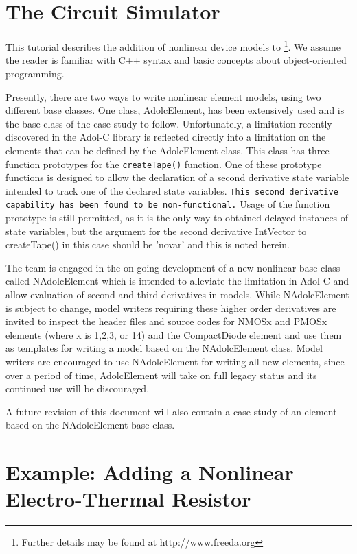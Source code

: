 \section{The \FDA Circuit Simulator}

This tutorial describes the addition of nonlinear device models to
\FDA \footnote{Further details may be found at
http://www.freeda.org}. We assume the reader is familiar with C++
syntax and basic concepts about object-oriented programming.

Presently, there are two ways to write nonlinear element models,
using two different base classes.  One class, AdolcElement, has
been extensively used and is the base class of the case study
to follow.  Unfortunately, a limitation recently discovered in
the Adol-C library is reflected directly into a limitation on
the elements that can be defined by the AdolcElement class.
This class has three function prototypes for the \texttt{createTape()}
function.  One of these prototype functions is designed to
allow the declaration of a second derivative state variable
intended to track one of the declared state variables.  \texttt{This
second derivative capability has been found to be non-functional.}
Usage of the function prototype is still permitted, as it is the
only way to obtained delayed instances of state variables, but
the argument for the second derivative IntVector to createTape() in
this case should be 'novar' and this is noted herein.

The \FDA team is engaged in the on-going development of a new
nonlinear base class called NAdolcElement which is intended to
alleviate the limitation in Adol-C and allow evaluation of
second and third derivatives in models.  While NAdolcElement
is subject to change, model writers requiring these higher
order derivatives are invited to inspect the header files and
source codes for NMOSx and PMOSx elements (where x is 1,2,3,
or 14) and the CompactDiode element and use them as templates
for writing a model based on the NAdolcElement class.  Model
writers are encouraged to use NAdolcElement for writing all
new elements, since over a period of time, AdolcElement will take
on full legacy status and its continued use will be discouraged.

A future revision of this document will also contain a case
study of an element based on the NAdolcElement base class.


\section{Example: Adding a Nonlinear Electro-Thermal Resistor}

